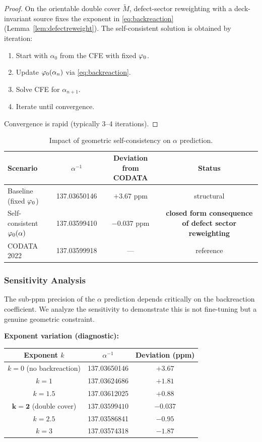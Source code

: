 \begin{proof}
On the orientable double cover $\widetilde{M}$, defect-sector reweighting with a
deck-invariant source fixes the exponent in \eqref{eq:backreaction}
(Lemma~\ref{lem:defectreweight}). The self-consistent solution is obtained by iteration:
\begin{enumerate}
    \item Start with $\alpha_0$ from the CFE with fixed $\varphi_0$.
    \item Update $\varphi_0(\alpha_n)$ via \eqref{eq:backreaction}.
    \item Solve CFE for $\alpha_{n+1}$.
    \item Iterate until convergence.
\end{enumerate}
Convergence is rapid (typically 3--4 iterations).
\end{proof}

\begin{table}[H]
\centering
\begin{tabular}{@{}lccc@{}}
\toprule
\textbf{Scenario} & $\alpha^{-1}$ & \textbf{Deviation from CODATA} & \textbf{Status}\\
\midrule
Baseline (fixed $\varphi_0$) & 137.03650146 & $+3.67$ ppm & structural\\
Self-consistent $\varphi_0(\alpha)$ & 137.03599410 & $-0.037$ ppm & \textbf{closed form consequence of defect sector reweighting}\\
CODATA 2022 & 137.03599918 & --- & reference\\
\bottomrule
\end{tabular}
\caption{Impact of geometric self-consistency on $\alpha$ prediction.}
\label{tab:alpha}
\end{table}

\subsubsection{Sensitivity Analysis}
\label{sec:sensitivity}

The sub-ppm precision of the $\alpha$ prediction depends critically on the backreaction 
coefficient. We analyze the sensitivity to demonstrate this is not fine-tuning but 
a genuine geometric constraint.

\textbf{Exponent variation (diagnostic):}
\begin{center}
\begin{tabular}{@{}ccc@{}}
\toprule
\textbf{Exponent $k$} & $\alpha^{-1}$ & \textbf{Deviation (ppm)}\\
\midrule
$k = 0$ (no backreaction) & 137.03650146 & $+3.67$\\
$k = 1$ & 137.03624686 & $+1.81$\\
$k = 1.5$ & 137.03612025 & $+0.88$\\
$\mathbf{k = 2}$ (double cover) & $\mathbf{137.03599410}$ & $\mathbf{-0.037}$\\
$k = 2.5$ & 137.03586841 & $-0.95$\\
$k = 3$ & 137.03574318 & $-1.87$\\
\bottomrule
\end{tabular}
\end{center}

